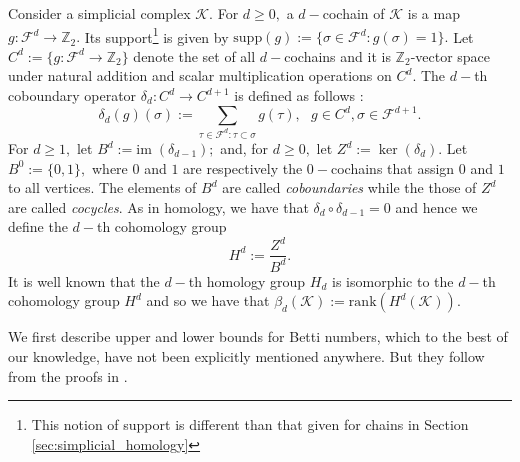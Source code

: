 \documentclass[12pt]{amsart}
\numberwithin{equation}{section}
\numberwithin{theorem}{section}
\newcommand{\cobdr}{\delta}
\newcommand{\im}{\mathrm{im}\;}
\newcommand{\1}{\mathbf{1}}
\def\F{\mathcal{F}}
\def\K{\mathcal{K}}
\def\bZ{\mathbb{Z}}
\def\rank{\mathrm{rank}}
\def\supp{\mathrm{supp}}
\begin{document}
Consider a simplicial complex $\K.$ For $d \geq 0,$ a $d-$cochain of $\K$ is a map $g:\F^d \to \bZ_2.$ Its support\footnote{This notion of support is different than that given for chains in Section \ref{sec:simplicial_homology}} is given by $\supp(g):= \{\sigma \in \F^d:  g(\sigma) = 1\}.$ Let $C^d := \{g : \F^d \to \bZ_2\}$ denote the set of all $d-$cochains and it is $\bZ_2$-vector space under natural addition and scalar multiplication operations on $C^d$.
The $d-$th coboundary operator $\cobdr_d : C^d \to C^{d + 1}$ is defined as follows :
%
\begin{equation}
\label{defn:Cobdr}
\cobdr_{d}(g)(\sigma) := \sum_{\tau \in \F^{d} : \tau \subset \sigma} g(\tau), \, \, \, \, g \in C^d, \sigma \in \F^{d + 1}.
\end{equation}
%
For $d \geq 1,$ let $B^d := \im (\cobdr_{d - 1});$ and, for $d \geq 0,$ let $Z^d := \ker(\cobdr_{d}).$ Let $B^0 := \{0, 1\},$ where $0$ and $1$ are respectively the $0-$cochains that assign $0$ and $1$ to all vertices. The elements of $B^d$ are called {\em coboundaries} while the those of $Z^d$ are called {\em cocycles}. As in homology, we have that $\cobdr_d \circ \cobdr_{d-1} = 0$ and hence we define the $d-$th cohomology group
\[
H^d := \frac{Z^d}{B^d}.
\]
It is well known that the $d-$th homology group $H_d$ is isomorphic to the $d-$th cohomology group $H^d$  and so we have that $\beta_{d}(\K) := \rank(H^d(\K)).$

We first describe upper and lower bounds for Betti numbers, which to the best of our knowledge, have not been explicitly mentioned anywhere. But they follow from the proofs in \cite{linial2006homological,meshulam2009homological,kahle2014inside}.
\end{document}
